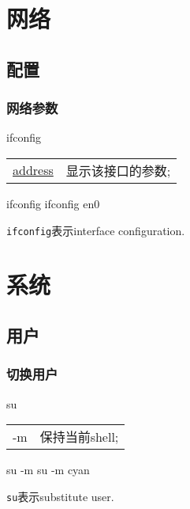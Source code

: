 \documentclass[hidelinks]{ctexart}
\begin{document}



\section{网络} %
\label{sec:网络}

\subsection{配置} %
\label{sub:配置}

\subsubsection{网络参数} %
\label{ssub:网络参数}

\begin{shcommand}{ifconfig}
\ttfamily
\begin{tabular}{@{$\bullet\quad$}ll}
    \underline{address}     & 显示该接口的参数; \\
\end{tabular} 
\end{shcommand}
\begin{shlst}
ifconfig
ifconfig en0
\end{shlst}
\texttt{ifconfig}表示interface configuration.




\section{系统} %
\label{sec:系统}

\subsection{用户} %
\label{sub:用户}

\subsubsection{切换用户} %
\label{ssub:切换用户}

\begin{shcommand}{su}
\ttfamily
\begin{tabular}{@{$\bullet\quad$}ll}
   -m      & 保持当前shell;
\end{tabular} 
\end{shcommand}
\begin{shlst}
su -m
su -m cyan
\end{shlst}
\texttt{su}表示substitute user.
\end{document}
